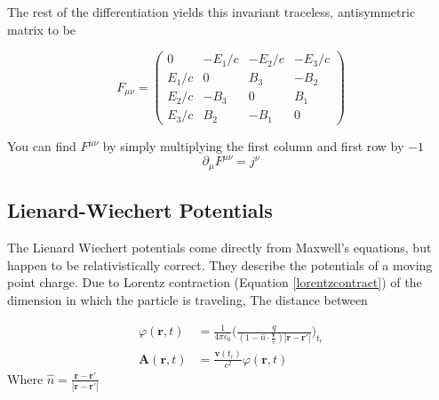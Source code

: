 The rest of the differentiation yields this invariant traceless, antisymmetric matrix to be

$$F_{\mu\nu} = \left({\begin{array}{cccc}
0&-E_1/c & -E_2/c & -E_3/c\\
E_1/c& 0 & B_3 & -B_2 \\
E_2/c& -B_3 & 0 & B_1 \\
E_3/c& B_2 & -B_1 & 0
\end{array}}\right)$$

You can find $F^{\mu\nu}$ by simply multiplying the first column and first row by $-1$
$$\partial_\mu F^{\mu\nu} = j^\nu$$




 
 \subsection{Lienard-Wiechert Potentials}
 The Lienard Wiechert potentials come directly from Maxwell's equations, but happen to be relativistically correct. They describe the potentials of a moving point charge. Due to Lorentz contraction (Equation \ref{lorentzcontract}) of the dimension in which the particle is traveling, The distance between 
 
 \begin{align}
    \varphi(\textbf{r},t) &= \frac{1}{4\pi\epsilon_0}\Big(\frac{q}{(1-\hat{n}\cdot\frac{\textbf{v}}{c})|\textbf{r}-\textbf{r}'|} \Big)_{t_{r}}\\
    \textbf{A}(\textbf{r},t) &= \frac{\textbf{v}(t_r)}{c^2}\varphi(\textbf{r},t)
 \end{align}
 Where $\hat{n} = \frac{\textbf{r}-\textbf{r}'}{|\textbf{r}-\textbf{r}'|}$


